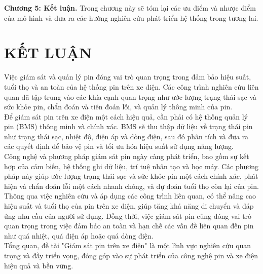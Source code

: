 \documentclass[a4paper,13pt]{article}
\theoremstyle{mytheor}
\begin{document}
\textbf{Chương 5: Kết luận.} Trong chương này sẽ tóm lại các ưu điểm và nhược điểm của mô hình và đưa ra các hướng nghiên cứu phát triển hệ thống trong tương lai.\\

\section{KẾT LUẬN}
Việc giám sát và quản lý pin đóng vai trò quan trọng trong đảm bảo hiệu suất, tuổi thọ và an toàn của hệ thống pin trên xe điện. Các công trình nghiên cứu liên quan đã tập trung vào các khía cạnh quan trọng như ước lượng trạng thái sạc và sức khỏe pin, chẩn đoán và tiên đoán lỗi, và quản lý thông minh của pin.\\

Để giám sát pin trên xe điện một cách hiệu quả, cần phải có hệ thống quản lý pin (BMS) thông minh và chính xác. BMS sẽ thu thập dữ liệu về trạng thái pin như trạng thái sạc, nhiệt độ, điện áp và dòng điện, sau đó phân tích và đưa ra các quyết định để bảo vệ pin và tối ưu hóa hiệu suất sử dụng năng lượng.\\

Công nghệ và phương pháp giám sát pin ngày càng phát triển, bao gồm sự kết hợp của cảm biến, hệ thống ghi dữ liệu, trí tuệ nhân tạo và học máy. Các phương pháp này giúp ước lượng trạng thái sạc và sức khỏe pin một cách chính xác, phát hiện và chẩn đoán lỗi một cách nhanh chóng, và dự đoán tuổi thọ còn lại của pin.\\

Thông qua việc nghiên cứu và áp dụng các công trình liên quan, có thể nâng cao hiệu suất và tuổi thọ của pin trên xe điện, giúp tăng khả năng di chuyển và đáp ứng nhu cầu của người sử dụng. Đồng thời, việc giám sát pin cũng đóng vai trò quan trọng trong việc đảm bảo an toàn và hạn chế các vấn đề liên quan đến pin như quá nhiệt, quá điện áp hoặc quá dòng điện.\\

Tổng quan, đề tài "Giám sát pin trên xe điện" là một lĩnh vực nghiên cứu quan trọng và đầy triển vọng, đóng góp vào sự phát triển của công nghệ pin và xe điện hiệu quả và bền vững.\\
\end{document}
